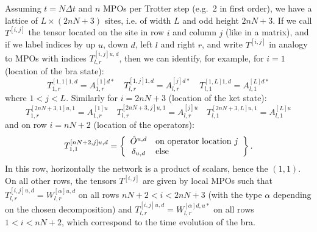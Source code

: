 \documentclass[a4paper,10pt,oneside,onecolumn,1p,times]{elsarticle}
\begin{document}
Assuming $t=N\Delta t$ and $n$ MPOs per Trotter step (e.g.\ 2 in first order), we have a lattice of $L \times (2nN+3)$ sites, i.e. of width $L$ and odd height $2nN+3$. If we call $T^{[i,j]}$ the tensor located on the site in row $i$ and column $j$ (like in a matrix), and if we label indices by up $u$, down $d$, left $l$ and right $r$, and write $T^{[i,j]}$ in analogy to MPOs with indices $T^{[i,j]u,d}_{l,r}$, then we can identify, for example, for $i=1$ (location of the bra state):
\begin{equation}
T^{[1,1] 1,d}_{1,r} = A^{[1]d*}_{1,r} \quad
T^{[1,j] 1,d}_{l,r} = A^{[j]d*}_{l,r} \quad
T^{[1,L] 1,d}_{l,1} = A^{[L]d*}_{l,1}
\end{equation}
where $1<j<L$. Similarly for $i=2nN+3$ (location of the ket state):
\begin{equation}
T^{[2nN+3,1] u,1}_{1,r} = A^{[1]u}_{1,r} \quad
T^{[2nN+3,j] u,1}_{l,r} = A^{[j]u}_{l,r} \quad
T^{[2nN+3,L] u,1}_{l,1} = A^{[L]u}_{l,1}
\end{equation}
and on row $i=nN+2$ (location of the operators):
\begin{equation}
T^{[nN+2,j] u,d}_{1,1} = \left\{ \begin{array}{cl} \hat{O}^{u,d} & {\rm on\ operator\ location\ } j \\
\delta_{u,d} & {\rm else} \end{array} \right\} .
\end{equation}
In this row, horizontally the network is a product of scalars, hence the $(1,1)$. On all other rows, the tensors $T^{[i,j]}$ are given by local MPOs such that $T^{[i,j]u,d}_{l,r}= W^{[\alpha]u,d}_{l,r}$ on all rows $nN+2 < i < 2nN+3$ (with the type $\alpha$ depending on the chosen decomposition) and 
$T^{[i,j]u,d}_{l,r}= W^{[\alpha]d,u*}_{l,r}$ on all rows $1 < i < nN+2$, which correspond to the time evolution of the bra.
\end{document}
